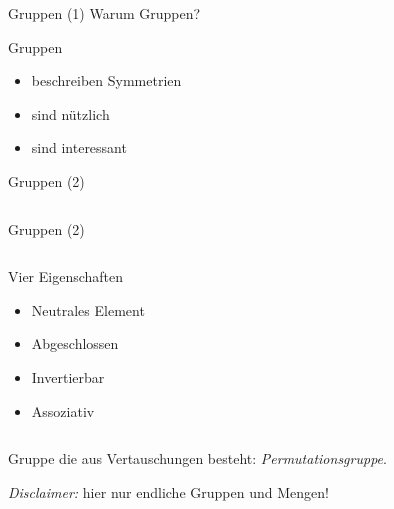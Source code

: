 \begin{frame}{Gruppen (1)}
Warum Gruppen?

\pause
Gruppen
\begin{itemize}
\item beschreiben Symmetrien
\pause
\item sind nützlich
\pause
\item sind interessant
\end{itemize}
\end{frame}


\begin{frame}{Gruppen (2)}
\begin{columns}
\begin{column}{0.4\textwidth}
\vspace{6.65em}
\end{column}
\begin{column}{0.5\textwidth}
\begin{center}
\end{center}
\end{column}
\end{columns}
\vspace{1.4em}
\end{frame}

\begin{frame}[noframenumbering]{Gruppen (2)}
\begin{columns}
\begin{column}{0.4\textwidth}
\pause
Vier Eigenschaften
\begin{itemize}
\pause
\item Neutrales Element
\pause
\item Abgeschlossen
\pause
\item Invertierbar
\pause
\item Assoziativ
\end{itemize}
\end{column}
\begin{column}{0.5\textwidth}
\begin{center}
\end{center}
\end{column}
\end{columns}
\vspace{-2em}
\pause
Gruppe die aus Vertauschungen besteht:
\emph{Permutationsgruppe}.

\pause
\emph{Disclaimer:} hier nur endliche Gruppen und Mengen!
\end{frame}

